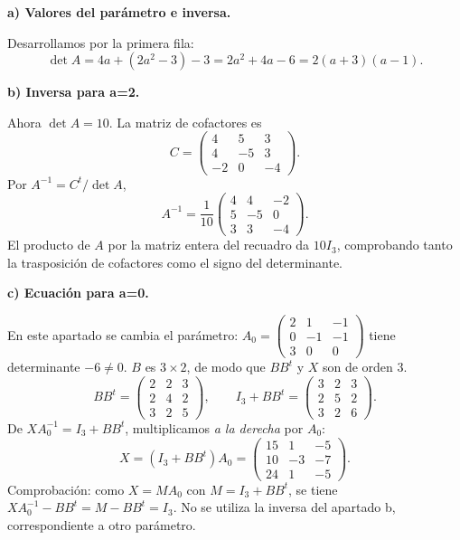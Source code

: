 \textbf{a) Valores del parámetro e inversa.}\par\nopagebreak[4]
Desarrollamos por la primera fila:
\[
\det A=4a+(2a^2-3)-3=2a^2+4a-6=2(a+3)(a-1).
\]

\textbf{b) Inversa para a=2.}\par\nopagebreak[4]
Ahora $\det A=10$. La matriz de cofactores es
\[
C=\begin{pmatrix}4&5&3\\4&-5&3\\-2&0&-4\end{pmatrix}.
\]
Por $A^{-1}=C^t/\det A$,
\[
\boxed{A^{-1}=\frac1{10}\begin{pmatrix}4&4&-2\\5&-5&0\\3&3&-4\end{pmatrix}.}
\]
El producto de $A$ por la matriz entera del recuadro da $10I_3$, comprobando tanto la trasposición de cofactores como el signo del determinante.

\textbf{c) Ecuación para a=0.}\par\nopagebreak[4]
En este apartado se cambia el parámetro: $A_0=\begin{pmatrix}2&1&-1\\0&-1&-1\\3&0&0\end{pmatrix}$ tiene determinante $-6\ne0$. $B$ es $3\times2$, de modo que $BB^t$ y $X$ son de orden $3$.
\[
BB^t=\begin{pmatrix}2&2&3\\2&4&2\\3&2&5\end{pmatrix},\qquad
I_3+BB^t=\begin{pmatrix}3&2&3\\2&5&2\\3&2&6\end{pmatrix}.
\]
De $XA_0^{-1}=I_3+BB^t$, multiplicamos \emph{a la derecha} por $A_0$:
\[
\boxed{X=(I_3+BB^t)A_0=\begin{pmatrix}15&1&-5\\10&-3&-7\\24&1&-5\end{pmatrix}.}
\]
Comprobación: como $X=MA_0$ con $M=I_3+BB^t$, se tiene $XA_0^{-1}-BB^t=M-BB^t=I_3$. No se utiliza la inversa del apartado b, correspondiente a otro parámetro.
